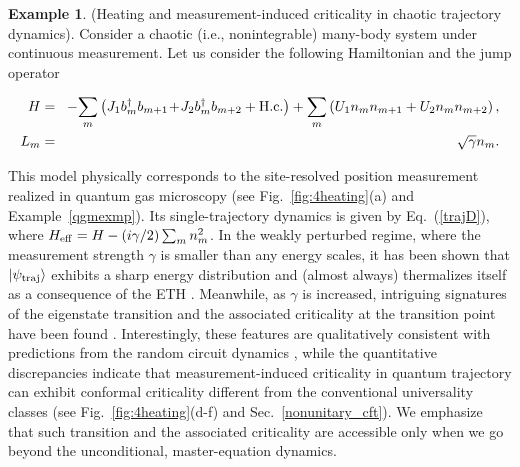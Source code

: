 \documentclass{tADP2e}
\theoremstyle{plain}
\newcommand{\eqn}[1]{
\begin{eqnarray}
	#1
\end{eqnarray}
}
\theoremstyle{plain}
\theoremstyle{definition}
\newtheorem{example}{Example}[section]
\newcommand{\exmp}[1]{
\begin{example}
	#1
\end{example}
}
\begin{document}
\exmp{(Heating and measurement-induced criticality in chaotic trajectory dynamics). Consider a chaotic (i.e., nonintegrable) many-body system under continuous  measurement. Let us consider the following Hamiltonian \cite{KH14} and the jump operator
\eqn{
H&=&\!-\!\sum_{m}\left(J_{1}b_{m}^{\dagger}b_{m+1}\!+\!J_{2}b_{m}^{\dagger}b_{m+2}+{\rm H.c.}\right)+\sum_{m}\left(U_{1}n_{m}n_{m+1}+U_{2}n_{m}n_{m+2}\right),\\
L_m&=&\sqrt{\gamma}n_m.
}
This model physically corresponds to the site-resolved position measurement realized in quantum gas microscopy (see Fig.~\ref{fig:4heating}(a) and Example~\ref{qgmexmp}). 
Its single-trajectory dynamics is given by {Eq.~(\ref{trajD})}, 
where $H_{\rm eff}=H-(i\gamma/2)\sum_m n_m^2$. In the weakly perturbed regime, where the measurement strength $\gamma$ is smaller than any energy scales, it has been shown that $|\psi_{\rm traj}\rangle$ exhibits a sharp energy distribution and (almost always) thermalizes itself as a consequence of  the ETH  \cite{YA18therm}. Meanwhile, as $\gamma$ is increased, intriguing signatures of the eigenstate transition and the associated criticality at the transition point have been found \cite{YF20}. Interestingly,  these features are qualitatively consistent with predictions from the random circuit dynamics \cite{LY19}, while the quantitative discrepancies indicate that  measurement-induced criticality in quantum trajectory can exhibit conformal criticality different from the conventional universality classes (see Fig.~\ref{fig:4heating}(d-f) and Sec.~\ref{nonunitary_cft}). We emphasize that such transition and the associated criticality are accessible only when we go beyond the unconditional, master-equation dynamics.
}
\end{document}
